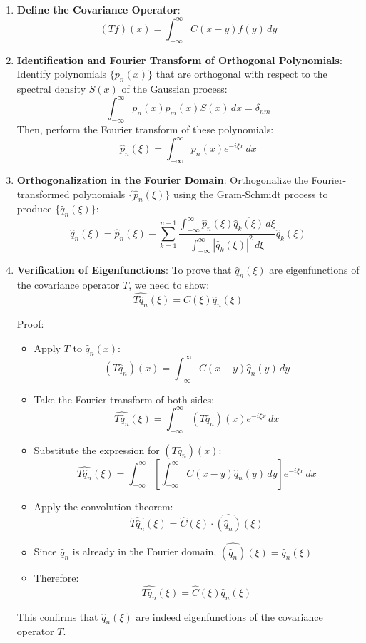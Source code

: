 \documentclass{article}
\begin{document}
\begin{enumerate}
  \item \textbf{Define the Covariance Operator}: 
  \[
  (Tf)(x) = \int_{-\infty}^{\infty} C(x-y) f(y) \, dy
  \]

  \item \textbf{Identification and Fourier Transform of Orthogonal Polynomials}:
  Identify polynomials $\{p_n(x)\}$ that are orthogonal with respect to the spectral density $S(x)$ of the Gaussian process:
  \[
  \int_{-\infty}^{\infty} p_n(x) p_m(x) S(x) \, dx = \delta_{nm}
  \]
  Then, perform the Fourier transform of these polynomials:
  \[
  \hat{p}_n(\xi) = \int_{-\infty}^\infty p_n(x) e^{-i\xi x} \, dx
  \]

  \item \textbf{Orthogonalization in the Fourier Domain}:
  Orthogonalize the Fourier-transformed polynomials $\{\hat{p}_n(\xi)\}$ using the Gram-Schmidt process to produce $\{\hat{q}_n(\xi)\}$:
  \[
  \hat{q}_n(\xi) = \hat{p}_n(\xi) - \sum_{k=1}^{n-1} \frac{\int_{-\infty}^\infty \hat{p}_n(\xi) \overline{\hat{q}_k(\xi)} \, d\xi}{\int_{-\infty}^\infty |\hat{q}_k(\xi)|^2 \, d\xi} \hat{q}_k(\xi)
  \]

  \item \textbf{Verification of Eigenfunctions}:
  To prove that $\hat{q}_n(\xi)$ are eigenfunctions of the covariance operator $T$, we need to show:
  \[
  \widehat{T\hat{q}_n}(\xi) = \hat{C}(\xi) \hat{q}_n(\xi)
  \]
  
  Proof:
  \begin{itemize}
    \item Apply $T$ to $\hat{q}_n(x)$:
      \[
      (T\hat{q}_n)(x) = \int_{-\infty}^{\infty} C(x-y) \hat{q}_n(y) \, dy
      \]
    \item Take the Fourier transform of both sides:
      \[
      \widehat{T\hat{q}_n}(\xi) = \int_{-\infty}^{\infty} (T\hat{q}_n)(x) e^{-i\xi x} \, dx
      \]
    \item Substitute the expression for $(T\hat{q}_n)(x)$:
      \[
      \widehat{T\hat{q}_n}(\xi) = \int_{-\infty}^{\infty} \left[\int_{-\infty}^{\infty} C(x-y) \hat{q}_n(y) \, dy\right] e^{-i\xi x} \, dx
      \]
    \item Apply the convolution theorem:
      \[
      \widehat{T\hat{q}_n}(\xi) = \hat{C}(\xi) \cdot \widehat{(\hat{q}_n)}(\xi)
      \]
    \item Since $\hat{q}_n$ is already in the Fourier domain, $\widehat{(\hat{q}_n)}(\xi) = \hat{q}_n(\xi)$
    \item Therefore:
      \[
      \widehat{T\hat{q}_n}(\xi) = \hat{C}(\xi) \hat{q}_n(\xi)
      \]
  \end{itemize}
  This confirms that $\hat{q}_n(\xi)$ are indeed eigenfunctions of the covariance operator $T$.


\end{enumerate}
\end{document}
